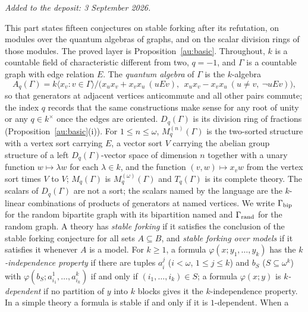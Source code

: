 \documentclass[11pt]{article}
\theoremstyle{definition}
\begin{document}
\medskip\noindent\emph{Added to the deposit: 3 September 2026.}\par\medskip

\providecommand{\forkind}{\mathop{\raise.2ex\hbox{$\scriptstyle|$}}\hspace{-.75ex}\raise-.1ex\hbox{$\scriptstyle\smile$}}

This part states fifteen conjectures on stable forking after its refutation, on modules over the quantum algebras of graphs, and on the scalar division rings of those modules.  The proved layer is Proposition~\ref{au:basic}.
Throughout, $k$ is a countable field of characteristic different from two,
$q=-1$, and $\Gamma$ is a countable graph with edge relation $E$.  The
\emph{quantum algebra} of $\Gamma$ is the $k$-algebra
\[
 A_q(\Gamma)=k\langle x_v:v\in\Gamma\rangle\big/
 \bigl(x_ux_v+x_vx_u\ (uEv),\ \ x_ux_v-x_vx_u\ (u\ne v,\ \neg uEv)\bigr),
\]
so that generators at adjacent vertices anticommute and all other pairs
commute; the index $q$ records that the same constructions make sense for
any root of unity or any $q\in k^\times$ once the edges are oriented.
$D_q(\Gamma)$ is its division ring of fractions (Proposition~\ref{au:basic}(i)).
For $1\le n\le\omega$, $M_q^{(n)}(\Gamma)$ is the two-sorted structure with a
vertex sort carrying $E$, a vector sort $V$ carrying the abelian group
structure of a left $D_q(\Gamma)$-vector space of dimension $n$ together
with a unary function $w\mapsto\lambda w$ for each $\lambda\in k$, and the
function $(v,w)\mapsto x_vw$ from the vertex sort times $V$ to $V$;
$M_q(\Gamma)$ is $M_q^{(\omega)}(\Gamma)$ and $T_q(\Gamma)$ is its complete
theory.  The scalars of $D_q(\Gamma)$ are not a sort; the scalars named by the
language are the $k$-linear combinations of products of generators at
named vertices.
We write $\Gamma_{\rm bip}$ for the random bipartite graph with its
bipartition named and $\Gamma_{\rm rand}$ for the random graph.  A theory
has \emph{stable forking} if it satisfies the conclusion of the stable
forking conjecture for all sets $A\subseteq B$, and \emph{stable forking
over models} if it satisfies it whenever $A$ is a model.  For $k\ge1$, a
formula $\varphi(x;y_1,\dots,y_k)$ has the \emph{$k$-independence property}
if there are tuples $a^j_i$ ($i<\omega$, $1\le j\le k$) and $b_S$
($S\subseteq\omega^k$) with $\varphi(b_S;a^1_{i_1},\dots,a^k_{i_k})$ if and
only if $(i_1,\dots,i_k)\in S$;
a formula $\varphi(x;y)$ is \emph{$k$-dependent} if no partition of $y$
into $k$ blocks gives it the $k$-independence property.  In a simple
theory a formula is stable if and only if it is $1$-dependent.  When a
\end{document}
